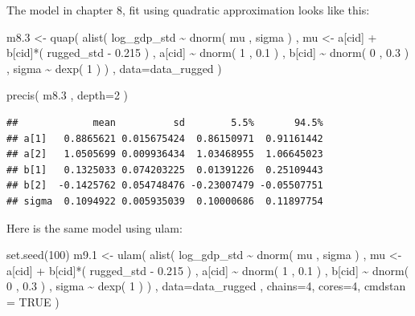 \documentclass[
]{book}
\newenvironment{Shaded}{\begin{snugshade}}{\end{snugshade}}
\newcommand{\AttributeTok}[1]{\textcolor[rgb]{0.77,0.63,0.00}{#1}}
\newcommand{\ConstantTok}[1]{\textcolor[rgb]{0.00,0.00,0.00}{#1}}
\newcommand{\DecValTok}[1]{\textcolor[rgb]{0.00,0.00,0.81}{#1}}
\newcommand{\FloatTok}[1]{\textcolor[rgb]{0.00,0.00,0.81}{#1}}
\newcommand{\FunctionTok}[1]{\textcolor[rgb]{0.00,0.00,0.00}{#1}}
\newcommand{\NormalTok}[1]{#1}
\newcommand{\OtherTok}[1]{\textcolor[rgb]{0.56,0.35,0.01}{#1}}
\newcommand{\SpecialCharTok}[1]{\textcolor[rgb]{0.00,0.00,0.00}{#1}}
\begin{document}
The model in chapter 8, fit using quadratic approximation looks like this:

\begin{Shaded}
\begin{Highlighting}[]
\NormalTok{m8}\FloatTok{.3} \OtherTok{\textless{}{-}} \FunctionTok{quap}\NormalTok{( }\FunctionTok{alist}\NormalTok{(}
\NormalTok{log\_gdp\_std }\SpecialCharTok{\textasciitilde{}} \FunctionTok{dnorm}\NormalTok{( mu , sigma ) , }
\NormalTok{mu }\OtherTok{\textless{}{-}}\NormalTok{ a[cid] }\SpecialCharTok{+}\NormalTok{ b[cid]}\SpecialCharTok{*}\NormalTok{( rugged\_std }\SpecialCharTok{{-}} \FloatTok{0.215}\NormalTok{ ) , }
\NormalTok{a[cid] }\SpecialCharTok{\textasciitilde{}} \FunctionTok{dnorm}\NormalTok{( }\DecValTok{1}\NormalTok{ , }\FloatTok{0.1}\NormalTok{ ) , }
\NormalTok{b[cid] }\SpecialCharTok{\textasciitilde{}} \FunctionTok{dnorm}\NormalTok{( }\DecValTok{0}\NormalTok{ , }\FloatTok{0.3}\NormalTok{ ) , }
\NormalTok{sigma }\SpecialCharTok{\textasciitilde{}} \FunctionTok{dexp}\NormalTok{( }\DecValTok{1}\NormalTok{ )}
\NormalTok{) , }\AttributeTok{data=}\NormalTok{data\_rugged )}

\FunctionTok{precis}\NormalTok{( m8}\FloatTok{.3}\NormalTok{ , }\AttributeTok{depth=}\DecValTok{2}\NormalTok{ )}
\end{Highlighting}
\end{Shaded}

\begin{verbatim}
##             mean          sd        5.5%       94.5%
## a[1]   0.8865621 0.015675424  0.86150971  0.91161442
## a[2]   1.0505699 0.009936434  1.03468955  1.06645023
## b[1]   0.1325033 0.074203225  0.01391226  0.25109443
## b[2]  -0.1425762 0.054748476 -0.23007479 -0.05507751
## sigma  0.1094922 0.005935039  0.10000686  0.11897754
\end{verbatim}

Here is the same model using ulam:

\begin{Shaded}
\begin{Highlighting}[]
\FunctionTok{set.seed}\NormalTok{(}\DecValTok{100}\NormalTok{)}
\NormalTok{m9}\FloatTok{.1} \OtherTok{\textless{}{-}} \FunctionTok{ulam}\NormalTok{( }\FunctionTok{alist}\NormalTok{(}
\NormalTok{log\_gdp\_std }\SpecialCharTok{\textasciitilde{}} \FunctionTok{dnorm}\NormalTok{( mu , sigma ) ,}
\NormalTok{mu }\OtherTok{\textless{}{-}}\NormalTok{ a[cid] }\SpecialCharTok{+}\NormalTok{ b[cid]}\SpecialCharTok{*}\NormalTok{( rugged\_std }\SpecialCharTok{{-}} \FloatTok{0.215}\NormalTok{ ) ,}
\NormalTok{a[cid] }\SpecialCharTok{\textasciitilde{}} \FunctionTok{dnorm}\NormalTok{( }\DecValTok{1}\NormalTok{ , }\FloatTok{0.1}\NormalTok{ ) ,}
\NormalTok{b[cid] }\SpecialCharTok{\textasciitilde{}} \FunctionTok{dnorm}\NormalTok{( }\DecValTok{0}\NormalTok{ , }\FloatTok{0.3}\NormalTok{ ) ,}
\NormalTok{sigma }\SpecialCharTok{\textasciitilde{}} \FunctionTok{dexp}\NormalTok{( }\DecValTok{1}\NormalTok{ )}
\NormalTok{) , }\AttributeTok{data=}\NormalTok{data\_rugged , }\AttributeTok{chains=}\DecValTok{4}\NormalTok{, }\AttributeTok{cores=}\DecValTok{4}\NormalTok{, }\AttributeTok{cmdstan =} \ConstantTok{TRUE}\NormalTok{ )}
\end{Highlighting}
\end{Shaded}
\end{document}
